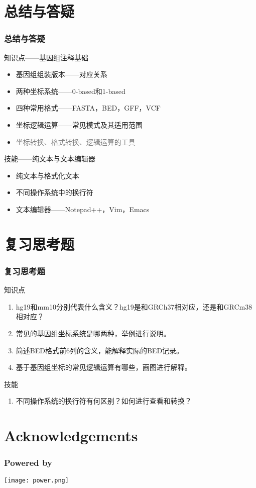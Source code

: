 \documentclass[table]{beamer}
\begin{document}
\section{总结与答疑}
\begin{frame}
  \frametitle{总结与答疑}
  \begin{block}{知识点——基因组注释基础}
    \begin{itemize}
      \item 基因组组装版本——对应关系
      \item 两种坐标系统——0-based和1-based
      \item 四种常用格式——FASTA，BED，GFF，VCF
      \item 坐标逻辑运算——常见模式及其适用范围
      \item \textcolor{gray}{坐标转换、格式转换、逻辑运算的工具}
    \end{itemize}
  \end{block}
  \begin{block}{技能——纯文本与文本编辑器}
    \begin{itemize}
      \item 纯文本与格式化文本
      \item 不同操作系统中的换行符
      \item 文本编辑器——Notepad++，Vim，Emacs
    \end{itemize}
  \end{block}
\end{frame}

\section{复习思考题}
\begin{frame}
  \frametitle{复习思考题}
  \begin{block}{知识点}
    \begin{enumerate}
      \item hg19和mm10分别代表什么含义？hg19是和GRCh37相对应，还是和GRCm38相对应？
      \item 常见的基因组坐标系统是哪两种，举例进行说明。
      \item 简述BED格式前6列的含义，能解释实际的BED记录。
      \item 基于基因组坐标的常见逻辑运算有哪些，画图进行解释。
    \end{enumerate}
  \end{block}
  \begin{block}{技能}
    \begin{enumerate}
      \item 不同操作系统的换行符有何区别？如何进行查看和转换？
    \end{enumerate}
  \end{block}
\end{frame}
\section*{Acknowledgements}
\begin{frame}
  \frametitle{Powered by}
  \begin{center}
    \texttt{[image: power.png]}
  \end{center}
\end{frame}
\end{document}
